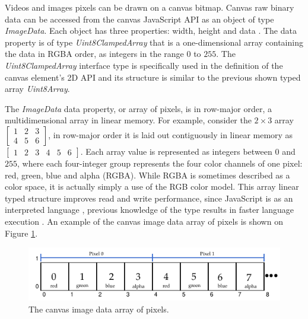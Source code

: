  Videos and images pixels can be drawn on a canvas bitmap. Canvas raw binary data can be accessed from the canvas JavaScript API as an object of type \textit{ImageData}. Each object has three properties: width, height and data \cite{Canvas2013,MDN2013}. The data property is of type \textit{Uint8ClampedArray} \cite{TypedArray2013} that is a one-dimensional array containing the data in RGBA \cite{Gonzalez2007} order, as integers in the range $0$ to $255$. The \textit{Uint8ClampedArray} interface type is specifically used in the definition of the canvas element's 2D API and its structure is  similar to the previous shown typed array \textit{Uint8Array}.

The \textit{ImageData} data property, or array of pixels, is in row-major order, a multidimensional array in linear memory. For example, consider the $2\times3$ array $\begin{bmatrix}
1 & 2 & 3\\
4 & 5 & 6
\end{bmatrix}$, in row-major order it is laid out contiguously in linear memory as $\begin{bmatrix}
1 & 2 & 3 & 4 & 5 & 6
\end{bmatrix}$. Each array value is represented as integers between $0$ and $255$, where each four-integer group represents the four color channels of one pixel: red, green, blue and alpha (RGBA). While RGBA is sometimes described as a color space, it is actually simply a use of the RGB color model. This array linear typed structure improves read and write performance, since JavaScript is as an interpreted language \cite{MDN2013}, previous knowledge of the type results in faster language execution \cite{TypedArray2013}. An example of the canvas image data array of pixels is shown on Figure \ref{figure:imagedata_array}.

\begin{figure}[!htb]
  \centering
  \includegraphics[width=\linewidth]{chapters/basic_concepts/imagedata_array.pdf}
  \caption{The canvas image data array of pixels.}
  \label{figure:imagedata_array}
\end{figure}


